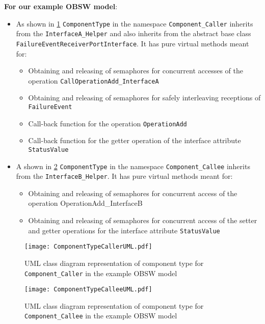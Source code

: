 \textbf{For our example OBSW model}:
\begin{itemize}
\item As shown in \cref{fig: Component type Caller UML} \texttt{ComponentType} in the namespace \texttt{Component\_Caller} inherits from the \texttt{InterfaceA\allowbreak\_Helper} and also inherits from the abstract base class \texttt{FailureEvent\allowbreak ReceiverPort\allowbreak Interface}. 
It has pure virtual methods meant for:

\begin{itemize}
\item Obtaining and releasing of semaphores for concurrent accesses of the operation \texttt{CallOperationAdd\allowbreak\_InterfaceA}
\item Obtaining and releasing of semaphores for safely interleaving receptions of \texttt{FailureEvent}
\item Call-back function for the operation \texttt{OperationAdd}
\item Call-back function for the getter operation of the interface attribute \texttt{StatusValue} 
\end{itemize}

\item A shown in \cref{fig: Component type Callee UML} \texttt{ComponentType} in the namespace \texttt{Component\_Callee} inherits from the \texttt{InterfaceB\allowbreak\_Helper}. 
It has pure virtual methods meant for:

\begin{itemize}
\item Obtaining and releasing of semaphores for concurrent access of the operation {OperationAdd\allowbreak\_InterfaceB}
\item Obtaining and releasing of semaphores for concurrent access of the setter and getter operations for the interface attribute \texttt{StatusValue}
\end{itemize}   
\end{itemize}

\begin{figure}[h]
	\centering
	\texttt{[image: ComponentTypeCallerUML.pdf]}
	\caption{UML class diagram representation of component type for \texttt{Component\allowbreak\_Caller} in the example OBSW model}
	\label{fig: Component type Caller UML}
\end{figure} 

\begin{figure}[h]
	\centering
	\texttt{[image: ComponentTypeCalleeUML.pdf]}
	\caption{UML class diagram representation of component type for \texttt{Component\allowbreak\_Callee} in the example OBSW model}
	\label{fig: Component type Callee UML}
\end{figure} 

